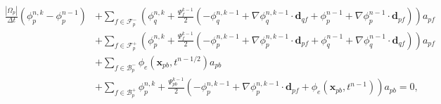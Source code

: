 \documentclass{article}
\begin{document}
\begin{align}
	\nonumber
	\frac{|\Omega_p|}{\Delta t}(\phi^{n,k}_p - \phi_p^{n-1})
	&+ \sum_{f \in \mathcal{F}_p^-}
	(\phi_q^{n,k} +
	\frac{\Psi_{f}^{k-1}}{2}(-\phi_q^{n,k-1} + \nabla\phi_q^{n,k-1}\cdot\boldsymbol{d}_{qf} +
	\phi_p^{n-1} + \nabla\phi_p^{n-1}\cdot\boldsymbol{d}_{pf})) a_{pf}
	\nonumber\\
	&+ \sum_{f \in \mathcal{F}_p^+}
	(\phi_p^{n,k} +
	\frac{\Psi_{f}^{k-1}}{2}(-\phi_p^{n,k-1} + \nabla\phi_p^{n,k-1}\cdot\boldsymbol{d}_{pf} +
	\phi_q^{n-1} + \nabla\phi_q^{n-1}\cdot\boldsymbol{d}_{qf})) a_{pf}
	\nonumber\\
	&+ \sum_{f \in \mathcal{B}_p^-}
	\phi_e(\boldsymbol{x}_{pb}, t^{n-1/2}) a_{pb}
	\nonumber\\
	&+ \sum_{f \in \mathcal{B}_p^+}
	\phi_p^{n,k} +
	\frac{\Psi_{pb}^{k-1}}{2}\left(-\phi_p^{n,k-1} + \nabla\phi_p^{n,k-1}\cdot\boldsymbol{d}_{pf} +
	\phi_e(\boldsymbol{x}_{pb}, t^{n-1})\right) a_{pb} = 0,
\end{align}
\end{document}
